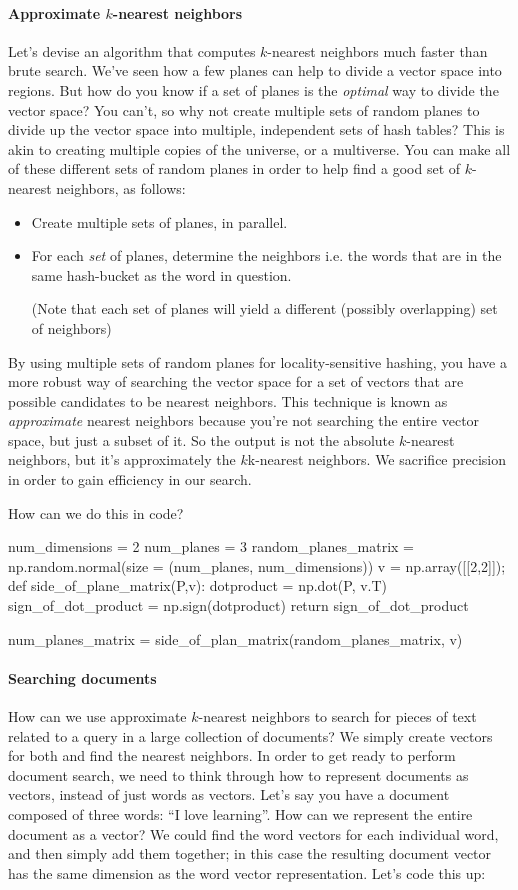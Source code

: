 \documentclass[12pt]{article}
\begin{document}
\paragraph{Approximate $k$-nearest neighbors} Let's devise an algorithm that computes $k$-nearest neighbors much faster than brute search. We've seen how a few planes can help to divide a vector space into regions. But how do you know if a set of planes is the \emph{optimal} way to divide the vector space? You can't, so why not create multiple sets of random planes to divide up the vector space into multiple, independent sets of hash tables? This is akin to creating multiple copies of the universe, or a multiverse. You can make all of these different sets of random planes in order to help find a good set of $k$-nearest neighbors, as follows:
\begin{itemize}
\item Create multiple sets of planes, in parallel.
\item For each \emph{set} of planes, determine the neighbors i.e. the words that   are in the same hash-bucket as the word in question.

(Note that each set of planes will yield a different (possibly overlapping) set of neighbors)
\end{itemize}
By using multiple sets of random planes for locality-sensitive hashing, you have a more robust way of searching the vector space for a set of vectors that are possible candidates to be nearest neighbors. This technique is known as \emph{approximate} nearest neighbors because you're not searching the entire vector space, but just a subset of it. So the output is not the absolute $k$-nearest neighbors, but it's approximately the $k$k-nearest neighbors. We sacrifice precision in order to gain efficiency in our search.

How can we do this in code?

\begin{python}
num_dimensions = 2
num_planes = 3
random_planes_matrix = np.random.normal(size = (num_planes, num_dimensions))
v = np.array([[2,2]]);
def side_of_plane_matrix(P,v):
  dotproduct = np.dot(P, v.T)
  sign_of_dot_product = np.sign(dotproduct)
  return sign_of_dot_product

num_planes_matrix = side_of_plan_matrix(random_planes_matrix, v)
\end{python}

\paragraph{Searching documents} How can we use approximate $k$-nearest neighbors to search for pieces of text related to a query in a large collection of documents? We simply create vectors for both and find the nearest neighbors. In order to get ready to perform document search, we need to think through how to represent documents as vectors, instead of just words as vectors. Let's say you have a document composed of three words: ``I love learning''. How can we represent the entire document as a vector? We could find the word vectors for each individual word, and then simply add them together; in this case the resulting document vector has the same dimension as the word vector representation. Let's code this up:
\end{document}
